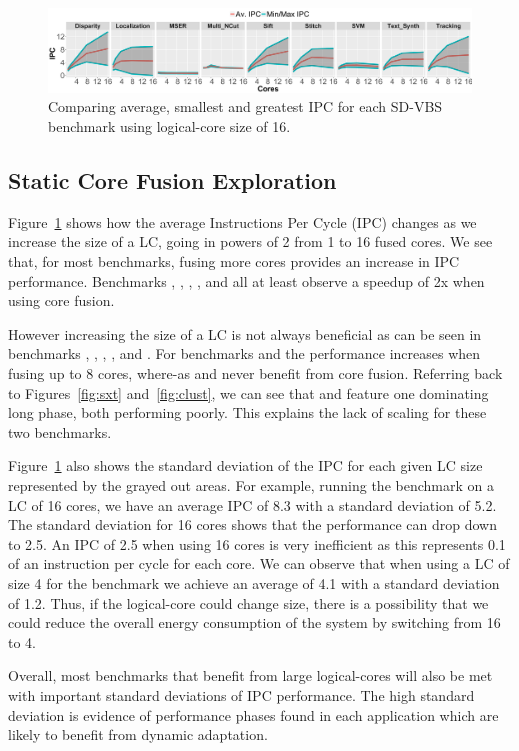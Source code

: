 \begin{figure}[t]
    \centering
    \includegraphics[width=1\textwidth]{cases-paper/graphics/Exploration/stddev.pdf}
        \vspace*{-7mm}
    \caption{Comparing average, smallest and greatest IPC for each SD-VBS benchmark using logical-core size of 16.}
    \label{fig:stddev}
\vspace{5mm}
\end{figure}
\subsection{Static Core Fusion Exploration}

Figure~\ref{fig:stddev} shows how the average Instructions Per Cycle (IPC) changes as we increase the size of a LC, going in powers of 2 from 1 to 16 fused cores.
We see that, for most benchmarks, fusing more cores provides an increase in IPC performance.
Benchmarks , , , ,  and  all at least observe a speedup of 2x when using core fusion.

However increasing the size of a LC is not always beneficial as can be seen in benchmarks , , , , and .
For benchmarks  and  the performance increases when fusing up to 8 cores, where-as  and  never benefit from core fusion. 
Referring back to Figures~\ref{fig:sxt} and~\ref{fig:clust}, we can see that  and  feature one dominating long phase, both performing poorly.
This explains the lack of scaling for these two benchmarks.

Figure~\ref{fig:stddev} also shows the standard deviation of the IPC for each given LC size represented by the grayed out areas.
For example, running the  benchmark on a LC of 16 cores, we have an average IPC of 8.3 with a standard deviation of 5.2.
The standard deviation for 16 cores shows that the performance can drop down to 2.5.
An IPC of 2.5 when using 16 cores is very inefficient as this represents 0.1 of an instruction per cycle for each core.
We can observe that when using a LC of size 4 for the  benchmark we achieve an average of 4.1 with a standard deviation of 1.2.
Thus, if the logical-core could change size, there is a possibility that we could reduce the overall energy consumption of the system by switching from 16 to 4.

Overall, most benchmarks that benefit from large logical-cores will also be met with important standard deviations of IPC performance.
The high standard deviation is evidence of performance phases found in each application which are likely to benefit from dynamic adaptation.

